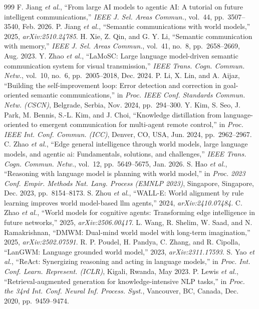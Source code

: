 \begin{thebibliography}{999}
 F. Jiang \emph{et al.}, ``From large AI models to agentic AI: A tutorial on future intelligent communications,'' \emph{IEEE J. Sel. Areas Commun.}, vol.~44, pp.~3507--3540, Feb. 2026.
 P. Jiang \emph{et al.}, ``Semantic communications with world models,'' 2025, \emph{arXiv:2510.24785}.
 H. Xie, Z. Qin, and G. Y. Li, ``Semantic communication with memory,'' \emph{IEEE J. Sel. Areas Commun.}, vol.~41, no.~8, pp.~2658--2669, Aug. 2023.
 Y. Zhao \emph{et al.}, ``LaMoSC: Large language model-driven semantic communication system for visual transmission,'' \emph{IEEE Trans. Cogn. Commun. Netw.}, vol.~10, no.~6, pp.~2005--2018, Dec. 2024.
 P. Li, X. Lin, and A. Aijaz, ``Building the self-improvement loop: Error detection and correction in goal-oriented semantic communications,'' in \emph{Proc. IEEE Conf. Standards Commun. Netw. (CSCN)}, Belgrade, Serbia, Nov. 2024, pp.~294--300.
 Y. Kim, S. Seo, J. Park, M. Bennis, S.-L. Kim, and J. Choi, ``Knowledge distillation from language-oriented to emergent communication for multi-agent remote control,'' in \emph{Proc. IEEE Int. Conf. Commun. (ICC)}, Denver, CO, USA, Jun. 2024, pp.~2962--2967.
 C. Zhao \emph{et al.}, ``Edge general intelligence through world models, large language models, and agentic ai: Fundamentals, solutions, and challenges,'' \emph{IEEE Trans. Cogn. Commun. Netw.}, vol.~12, pp.~5649--5675, Jan. 2026.
 S. Hao \emph{et al.}, ``Reasoning with language model is planning with world model,'' in \emph{Proc. 2023 Conf. Empir. Methods Nat. Lang. Process (EMNLP 2023)}, Singapore, Singapore, Dec. 2023, pp.~8154--8173.
 S. Zhou \emph{et al.}, ``WALL-E: World alignment by rule learning improves world model-based llm agents,'' 2024, \emph{arXiv:2410.07484}.
 C. Zhao \emph{et al.}, ``World models for cognitive agents: Transforming edge intelligence in future networks,'' 2025, \emph{arXiv:2506.00417}.
 L. Wang, R. Shelim, W. Saad, and N. Ramakrishnan, ``DMWM: Dual-mind world model with long-term imagination,'' 2025, \emph{arXiv:2502.07591}.
 R. P. Poudel, H. Pandya, C. Zhang, and R. Cipolla, ``LanGWM: Language grounded world model,'' 2023, \emph{arXiv:2311.17593}.
 S. Yao \emph{et al.}, ``ReAct: Synergizing reasoning and acting in language models,'' in \emph{Proc. Int. Conf. Learn. Represent. (ICLR)}, Kigali, Rwanda, May 2023.
 P. Lewis \emph{et al.}, ``Retrieval-augmented generation for knowledge-intensive NLP tasks,'' in \emph{Proc. the 34rd Int. Conf. Neural Inf. Process. Syst.}, Vancouver, BC, Canada, Dec. 2020, pp.~9459--9474.

\end{thebibliography}
